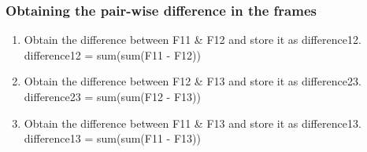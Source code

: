 \documentclass[10pt, letter]{article}
\begin{document}
\subsubsection*{Obtaining the pair-wise difference in the frames}
\begin{enumerate}
	\item Obtain the difference between F11 \& F12 and store it as difference12. \\
	\hspace*{3cm} difference12 = sum(sum(F11 - F12))
	\item Obtain the difference between F12 \& F13 and store it as difference23. \\
	\hspace*{3cm} difference23 = sum(sum(F12 - F13))
	\item Obtain the difference between F11 \& F13 and store it as difference13. \\
	\hspace*{3cm} difference13 = sum(sum(F11 - F13))	
\end{enumerate}
\end{document}
